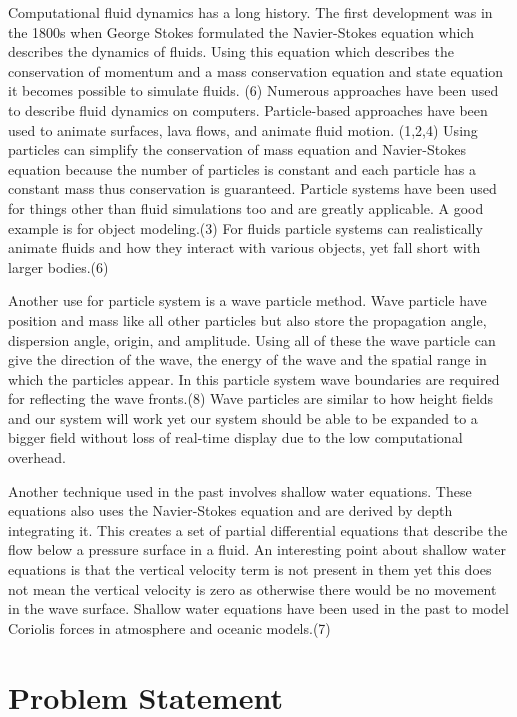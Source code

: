 \documentclass[12pt,titlepage]{article}
\begin{document}
Computational fluid dynamics has a long history. The first development was in the 1800s when George Stokes formulated the Navier-Stokes equation which describes the dynamics of fluids. Using this equation which describes the conservation of momentum and a mass conservation equation and state equation it becomes possible to simulate fluids. (6)
Numerous approaches have been used to describe fluid dynamics on computers. Particle-based approaches have been used to animate surfaces, lava flows, and animate fluid motion. (1,2,4) Using particles can simplify the conservation of mass equation and Navier-Stokes equation because the number of particles is constant and each particle has a constant mass thus conservation is guaranteed.
Particle systems have been used for things other than fluid simulations too and are greatly applicable. A good example is for object modeling.(3) For fluids particle systems can realistically animate fluids and how they interact with various objects, yet fall short with larger bodies.(6)

Another use for particle system is a wave particle method. Wave particle have position and mass like all other particles but also store the propagation angle, dispersion angle, origin, and amplitude. Using all of these the wave particle can give the direction of the wave, the energy of the wave and the spatial range in which the particles appear. In this particle system wave boundaries are required for reflecting the wave fronts.(8) Wave particles are similar to how height fields and our system will work yet our system should be able to be expanded to a bigger field without loss of real-time display due to the low computational overhead.

Another technique used in the past involves shallow water equations. These equations also uses the Navier-Stokes equation and are derived by depth integrating it. This creates a set of partial differential equations that describe the flow below a pressure surface in a fluid.  An interesting point about shallow water equations is that the vertical velocity term is not present in them yet this does not mean the vertical velocity is zero as otherwise there would be no movement in the wave surface. Shallow water equations have been used in the past to model Coriolis forces in atmosphere and oceanic models.(7)


\section{Problem Statement}
\end{document}
